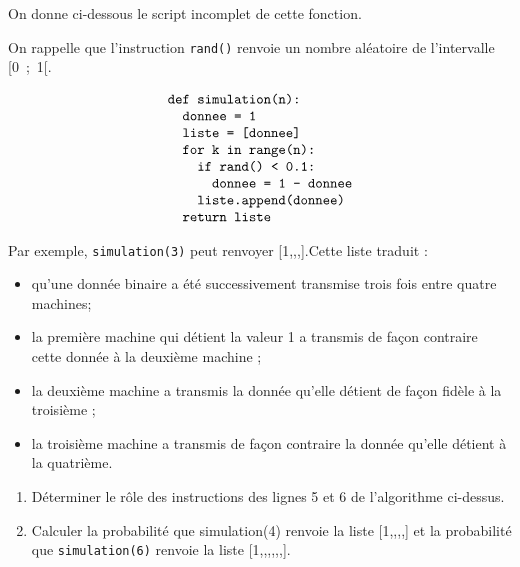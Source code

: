 \documentclass[10pt]{article}
\begin{document}
On donne ci-dessous le script incomplet de cette fonction.

On rappelle que l'instruction \texttt{rand()} renvoie un nombre aléatoire de l'intervalle [0~;~1[.


\[
\begin{array}{l}
\texttt{def simulation(n):}\\
\texttt{\hspace{1em}donnee = 1}\\
\texttt{\hspace{1em}liste = [donnee]}\\
\texttt{\hspace{1em}for k in range(n):}\\
\texttt{\hspace{2em}if rand() < 0.1:}\\
\texttt{\hspace{3em}donnee = 1 - donnee}\\
\texttt{\hspace{2em}liste.append(donnee)}\\
\texttt{\hspace{1em}return liste}
\end{array}
\]

\medskip

Par exemple, \texttt{simulation(3)} peut renvoyer [1,,,].Cette liste traduit :

\begin{itemize}[label=$\bullet~$]
\item qu'une donnée binaire a été successivement transmise trois fois entre quatre machines;
\item la première machine qui détient la valeur 1 a transmis de façon contraire cette donnée à la deuxième machine ;
\item la deuxième machine a transmis la donnée qu'elle détient de façon fidèle à la troisième ;
\item la troisième machine a transmis de façon contraire la donnée qu'elle détient à la quatrième.
\end{itemize}

\medskip

\begin{enumerate}
\item Déterminer le rôle des instructions des lignes 5 et 6 de l'algorithme ci-dessus.
\item Calculer la probabilité que simulation(4) renvoie la liste [1,,,,] et la probabilité que \texttt{simulation(6)} renvoie la liste [1,,,,,,].
\end{enumerate}

\bigskip
\end{document}
